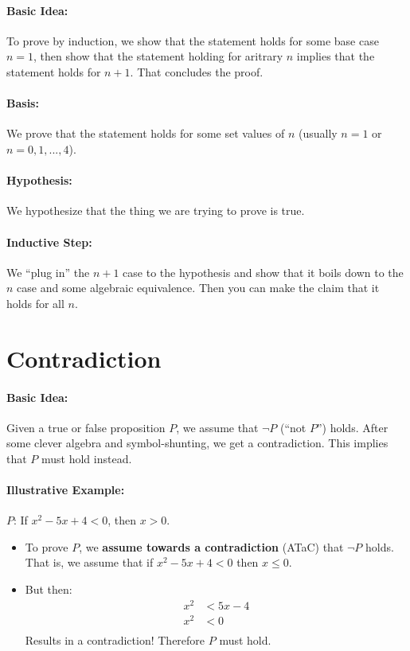 \documentclass[a4paper,12pt]{report}
\begin{document}
\paragraph{Basic Idea: } To prove by induction, we show that the statement holds for some base case $n = 1$, then show that the statement holding for aritrary $n$ implies that the statement holds for $n+1$. That concludes the proof. 

\paragraph{Basis: } We prove that the statement holds for some set values of $n$ (usually $n = 1$ or $n = 0,1,...,4$).

\paragraph{Hypothesis: } We hypothesize that the thing we are trying to prove is true. 

\paragraph{Inductive Step: } We ``plug in'' the $n+1$ case to the hypothesis and show that it boils down to the $n$ case and some algebraic equivalence. Then you can make the claim that it holds for all $n$.




\section{Contradiction}

\paragraph{Basic Idea: } Given a true or false proposition $P$, we assume that $\neg P$ (``not $P$'') holds. After some clever algebra and symbol-shunting, we get a contradiction. This implies that $P$ must hold instead. 

\paragraph{Illustrative Example: } $P$: If $x^2 - 5x + 4 < 0$, then $x > 0$.
\begin{itemize}
\item To prove $P$, we \textbf{assume towards a contradiction} (ATaC) that $\neg P$ holds. That is, we assume that if $x^2 - 5x + 4 < 0$ then $x \leq 0$. 
\item But then: 
\begin{equation}
\begin{split}
x^2 &< 5x-4 \\
x^2 &< 0 \\ 
\end{split}
\end{equation}
Results in a contradiction! Therefore $P$ must hold. 
\end{itemize}
\end{document}
